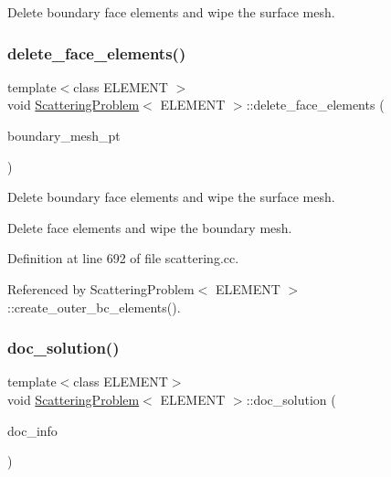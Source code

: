Delete boundary face elements and wipe the surface mesh. 

\mbox{\label{classScatteringProblem_aaef8a78e317333ddadd0be6a500c1134}} 
\subsubsection{\texorpdfstring{delete\+\_\+face\+\_\+elements()}{delete\_face\_elements()}\hspace{0.1cm}{\footnotesize\ttfamily [2/2]}}
{\footnotesize\ttfamily template$<$class E\+L\+E\+M\+E\+NT $>$ \\
void \hyperlink{classScatteringProblem}{Scattering\+Problem}$<$ E\+L\+E\+M\+E\+NT $>$\+::delete\+\_\+face\+\_\+elements (\begin{DoxyParamCaption}\item[{Mesh $\ast$const \&}]{boundary\+\_\+mesh\+\_\+pt }\end{DoxyParamCaption})}



Delete boundary face elements and wipe the surface mesh. 

Delete face elements and wipe the boundary mesh. 

Definition at line 692 of file scattering.\+cc.



Referenced by Scattering\+Problem$<$ E\+L\+E\+M\+E\+N\+T $>$\+::create\+\_\+outer\+\_\+bc\+\_\+elements().

\mbox{\label{classScatteringProblem_af83ab14c4f4750ea17c21466f6c6364f}} 
\subsubsection{\texorpdfstring{doc\+\_\+solution()}{doc\_solution()}\hspace{0.1cm}{\footnotesize\ttfamily [1/2]}}
{\footnotesize\ttfamily template$<$class E\+L\+E\+M\+E\+NT$>$ \\
void \hyperlink{classScatteringProblem}{Scattering\+Problem}$<$ E\+L\+E\+M\+E\+NT $>$\+::doc\+\_\+solution (\begin{DoxyParamCaption}\item[{Doc\+Info \&}]{doc\+\_\+info }\end{DoxyParamCaption})}



